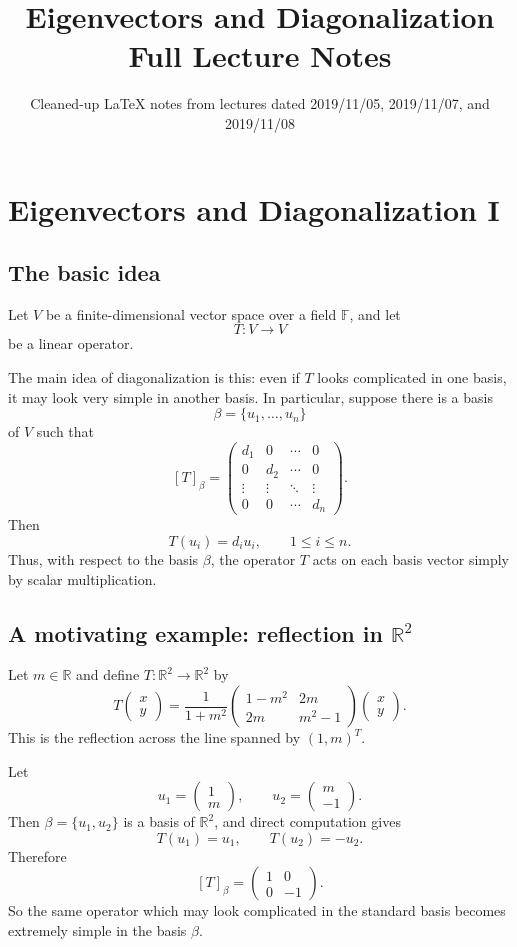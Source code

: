 \documentclass[11pt]{article}
\title{Eigenvectors and Diagonalization\\\large Full Lecture Notes}
\author{Cleaned-up LaTeX notes from lectures dated 2019/11/05, 2019/11/07, and 2019/11/08}
\date{}
\newcommand{\F}{\mathbb F}
\newcommand{\R}{\mathbb R}
\theoremstyle{definition}
\theoremstyle{plain}
\begin{document}
\maketitle
\tableofcontents

\section{Eigenvectors and Diagonalization I}

\subsection{The basic idea}

Let $V$ be a finite-dimensional vector space over a field $\F$, and let
\[
T:V\to V
\]
be a linear operator.

The main idea of diagonalization is this: even if $T$ looks complicated in one basis, it may look very simple in another basis.  In particular, suppose there is a basis
\[
\beta=\{u_1,\dots,u_n\}
\]
of $V$ such that
\[
[T]_{\beta}=\begin{pmatrix}
 d_1&0&\cdots&0\\
 0&d_2&\cdots&0\\
 \vdots&\vdots&\ddots&\vdots\\
 0&0&\cdots&d_n
\end{pmatrix}.
\]
Then
\[
T(u_i)=d_i u_i,\qquad 1\leq i\leq n.
\]
Thus, with respect to the basis $\beta$, the operator $T$ acts on each basis vector simply by scalar multiplication.

\subsection{A motivating example: reflection in \texorpdfstring{$\R^2$}{R2}}

Let $m\in\R$ and define $T:\R^2\to\R^2$ by
\[
T\begin{pmatrix}x\\y\end{pmatrix}
=\frac{1}{1+m^2}
\begin{pmatrix}
1-m^2&2m\\
2m&m^2-1
\end{pmatrix}
\begin{pmatrix}x\\y\end{pmatrix}.
\]
This is the reflection across the line spanned by $(1,m)^T$.

Let
\[
u_1=\begin{pmatrix}1\\m\end{pmatrix},
\qquad
u_2=\begin{pmatrix}m\\-1\end{pmatrix}.
\]
Then $\beta=\{u_1,u_2\}$ is a basis of $\R^2$, and direct computation gives
\[
T(u_1)=u_1,
\qquad
T(u_2)=-u_2.
\]
Therefore
\[
[T]_{\beta}=\begin{pmatrix}1&0\\0&-1\end{pmatrix}.
\]
So the same operator which may look complicated in the standard basis becomes extremely simple in the basis $\beta$.
\end{document}
